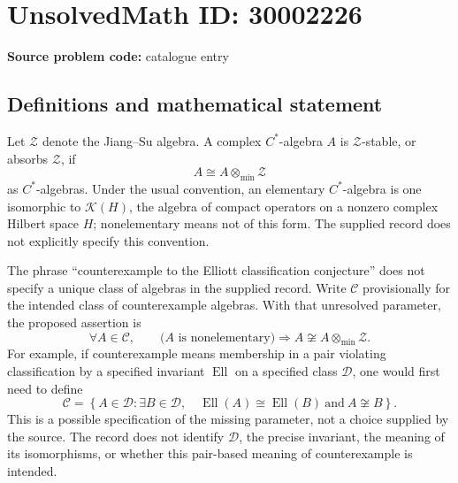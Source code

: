 \documentclass[11pt]{article}
\begin{document}
\section*{UnsolvedMath ID: 30002226}
\textbf{Source problem code:} catalogue entry
\subsection{Definitions and mathematical statement}
Let \(\mathcal Z\) denote the Jiang--Su algebra. A complex \(C^*\)-algebra \(A\) is \(\mathcal Z\)-stable, or absorbs \(\mathcal Z\), if
\[
A\cong A\otimes_{\min}\mathcal Z
\]
as \(C^*\)-algebras. Under the usual convention, an elementary \(C^*\)-algebra is one isomorphic to \(\mathcal K(H)\), the algebra of compact operators on a nonzero complex Hilbert space \(H\); nonelementary means not of this form. The supplied record does not explicitly specify this convention.

The phrase ``counterexample to the Elliott classification conjecture'' does not specify a unique class of algebras in the supplied record. Write \(\mathscr C\) provisionally for the intended class of counterexample algebras. With that unresolved parameter, the proposed assertion is
\[
\forall A\in\mathscr C,\qquad
\bigl(A\text{ is nonelementary}\bigr)
\Longrightarrow
A\not\cong A\otimes_{\min}\mathcal Z.
\]
For example, if counterexample means membership in a pair violating classification by a specified invariant \(\operatorname{Ell}\) on a specified class \(\mathscr D\), one would first need to define
\[
\mathscr C=
\left\{A\in\mathscr D:
\exists B\in\mathscr D,\quad
\operatorname{Ell}(A)\cong\operatorname{Ell}(B)
\ \text{and}\ A\not\cong B
\right\}.
\]
This is a possible specification of the missing parameter, not a choice supplied by the source. The record does not identify \(\mathscr D\), the precise invariant, the meaning of its isomorphisms, or whether this pair-based meaning of counterexample is intended.
\end{document}
